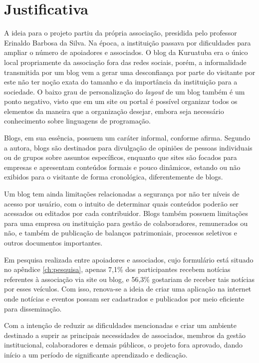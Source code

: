 \hspace{2.5cm}
\section{Justificativa}
\hspace{2.5cm}

A ideia para o projeto partiu da própria associação, presidida pelo professor Erinaldo Barbosa da Silva. Na época, a instituição passava por dificuldades para ampliar o número de apoiadores e associados. O blog da Kuruatuba era o único local propriamente da associação fora das redes sociais, porém, a informalidade transmitida por um blog vem a gerar uma desconfiança por parte do visitante por este não ter noção exata do tamanho e da importância da instituição para a sociedade. O baixo grau de personalização do \textit{layout} de um blog também é um ponto negativo, visto que em um site ou portal é possível organizar todos os elementos da maneira que a organização desejar, embora seja necessário conhecimento sobre linguagens de programação. 

Blogs, em sua essência, possuem um caráter informal, conforme  afirma. Segundo a autora, blogs são destinados para divulgação de opiniões de pessoas individuais ou de grupos sobre assuntos específicos, enquanto que sites são focados para empresas e apresentam conteúdos formais e pouco dinâmicos, estando ou não exibidos para o visitante de forma cronológica, diferentemente de blogs. 

Um blog tem ainda limitações relacionadas a segurança por não ter níveis de acesso por usuário, com o intuito de determinar quais conteúdos poderão ser acessados ou editados por cada contribuidor. Blogs também possuem limitações para uma empresa ou instituição para gestão de colaboradores, remunerados ou não, e também de publicação de balanços patrimoniais, processos seletivos e outros documentos importantes. 

Em pesquisa realizada entre apoiadores e associados, cujo formulário está situado no apêndice \ref{ch:pesquisa}, apenas 7,1\% dos participantes recebem notícias referentes à associação via site ou blog, e 56,3\% gostariam de receber tais notícias por esses veículos. Com isso, renova-se a ideia de criar uma aplicação na internet onde notícias e eventos possam ser cadastrados e publicados por meio eficiente para disseminação.

Com a intenção de reduzir as dificuldades mencionadas e criar um ambiente destinado a suprir as principais necessidades de associados, membros da gestão institucional, colaboradores e demais públicos, o projeto fora aprovado, dando início a um período de significante aprendizado e dedicação.

